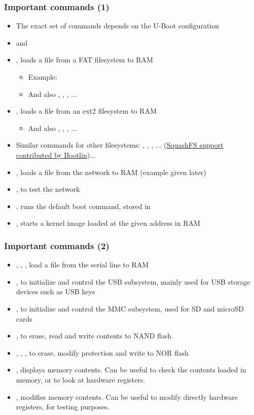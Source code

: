 \begin{frame}
  \frametitle{Important commands (1)}
  \begin{itemize}
  \item The exact set of commands depends on the U-Boot configuration
  \item {} and 
  \item {}, loads a file from a FAT filesystem to RAM
    \begin{itemize}
    \item Example: 
    \item And also , , ,
          ...
    \end{itemize}
  \item {}, loads a file from an ext2 filesystem to RAM
    \begin{itemize}
    \item And also , , ,
          ...
    \end{itemize}
  \item Similar commands for other filesystems: ,
      , , ...
      (\href{https://bootlin.com/blog/bootlin-contributes-squashfs-support-to-u-boot/}{SquashFS
      support contributed by Bootlin})...
  \item {}, loads a file from the network to RAM (example given later)
  \item {}, to test the network
  \item {}, runs the default boot command, stored in
  \item {}, starts a kernel image loaded at the
    given address in RAM
  \end{itemize}
\end{frame}

\begin{frame}
  \frametitle{Important commands (2)}
  \begin{itemize}
  \item {}, , , load a file from the
    serial line to RAM
  \item {}, to initialize and control the USB subsystem,
    mainly used for USB storage devices such as USB keys
  \item {}, to initialize and control the MMC subsystem, used
    for SD and microSD cards
  \item {}, to erase, read and write contents to NAND flash
  \item {}, , , to erase, modify
    protection and write to NOR flash
  \item {}, displays memory contents. Can be useful to check the
    contents loaded in memory, or to look at hardware registers.
  \item {}, modifies memory contents. Can be useful to modify
    directly hardware registers, for testing purposes.
\end{itemize}
\end{frame}

